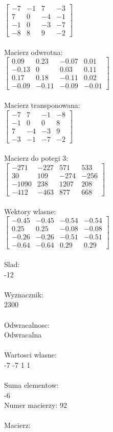 \documentclass[a4paper,12pt]{article}
\begin{document}
$\begin{bmatrix} -7&-1&7&-3\\7&0&-4&-1\\-1&0&-3&-7\\-8&8&9&-2 \end{bmatrix}$
\\
\\
Macierz odwrotna:\\

$\begin{bmatrix} 0.09&0.23&-0.07&0.01\\-0.13&0&0.03&0.11\\0.17&0.18&-0.11&0.02\\-0.09&-0.11&-0.09&-0.01 \end{bmatrix}$
\\
\\
Macierz transponowana:\\

$\begin{bmatrix} -7&7&-1&-8\\-1&0&0&8\\7&-4&-3&9\\-3&-1&-7&-2 \end{bmatrix}$
\\
\\
Macierz do potegi 3:\\

$\begin{bmatrix} -271&-227&571&533\\30&109&-274&-256\\-1090&238&1207&208\\-412&-463&877&668 \end{bmatrix}$
\\
\\
Wektory wlasne:\\

$\begin{bmatrix} -0.45&-0.45&-0.54&-0.54\\0.25&0.25&-0.08&-0.08\\-0.26&-0.26&-0.51&-0.51\\-0.64&-0.64&0.29&0.29 \end{bmatrix}$
\\
\\
Slad:\\
-12
\\
\\
Wyznacznik:\\
2300
\\
\\
Odwracalnosc:\\
Odwracalna
\\
\\
Wartosci wlasne:\\
-7 -7 1 1
\\
\\
Suma elementow:\\
-6
\\
\newpage
Numer macierzy:
92
\\
\\
Macierz:\\
\end{document}
